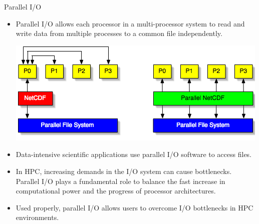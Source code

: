 \documentclass[compress,11pt,xcolor=svgnames,aspectratio=169]{beamer}
\begin{document}
\begin{frame}[fragile]{Parallel I/O}

\begin{itemize}
\setlength\itemsep{0.1cm}

  \item Parallel I/O allows each processor in a multi-processor system to read and write data from multiple processes to a common file independently.

  \begin{center}
  \includegraphics[scale=0.5]{fig/pnetcdf}
  \end{center}

  \item Data-intensive scientific applications use parallel I/O software to access files.

  \item In HPC, increasing demands in the I/O system can cause bottlenecks. Parallel I/O plays a fundamental role to balance the fast increase in computational power and the progress of processor architectures.

  \item Used properly, parallel I/O allows users to overcome I/O bottlenecks in HPC environments.

\end{itemize}

\end{frame}
\end{document}
